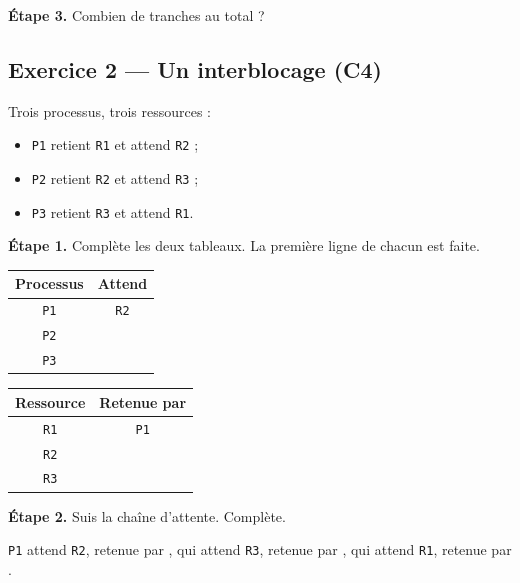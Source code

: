 \bigskip

\textbf{Étape 3.} Combien de tranches au total ?

\medskip
\dotfill

\bigskip
\bigskip

\subsection*{Exercice 2 --- Un interblocage (C4)}

Trois processus, trois ressources :

\begin{itemize}
  \item \texttt{P1} retient \texttt{R1} et attend \texttt{R2} ;
  \item \texttt{P2} retient \texttt{R2} et attend \texttt{R3} ;
  \item \texttt{P3} retient \texttt{R3} et attend \texttt{R1}.
\end{itemize}

\bigskip

\textbf{Étape 1.} Complète les deux tableaux. La première ligne de chacun est faite.

\bigskip

\begin{center}
\begin{tabular}{|c|c|}
\hline
\textbf{Processus} & \textbf{Attend} \\
\hline
\texttt{P1} & \texttt{R2} \\
\hline
\texttt{P2} & \dotfill \\
\hline
\texttt{P3} & \dotfill \\
\hline
\end{tabular}
\qquad
\begin{tabular}{|c|c|}
\hline
\textbf{Ressource} & \textbf{Retenue par} \\
\hline
\texttt{R1} & \texttt{P1} \\
\hline
\texttt{R2} & \dotfill \\
\hline
\texttt{R3} & \dotfill \\
\hline
\end{tabular}
\end{center}

\bigskip

\textbf{Étape 2.} Suis la chaîne d'attente. Complète.

\medskip
\texttt{P1} attend \texttt{R2}, retenue par \dotfill, qui attend \texttt{R3},
retenue par \dotfill, qui attend \texttt{R1}, retenue par \dotfill.


